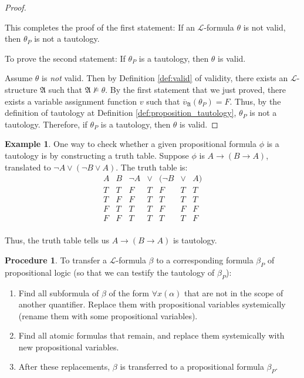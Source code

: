 \documentclass[11pt,letterpaper]{book}
\theoremstyle{definition}
\newtheorem{procedure}{Procedure}[section]
\newtheorem{example}{Example}[section]
\begin{document}
\begin{proof}
\begin{enumerate}
{}
\end{enumerate}
This completes the proof of the first statement: If an
$\mathcal{L}$-formula $\theta$ is not valid, then $\theta_P$ is not a
tautology.


To prove the second statement: If $\theta_P$ is a tautology, then
$\theta$ is valid.

Assume $\theta$ is \emph{not} valid. Then by
Definition \ref{def:valid} of validity, there exists an
$\mathcal{L}$-structure $\mathfrak{A}$ such that $\mathfrak{A} \not
\models \theta$. By the first statement that we just proved, there
exists a variable assignment function $v$ such that
$\overline{v}_{\mathfrak{A}} (\theta_P)  = F$. Thus, by the definition
of tautology at Definition \ref{def:proposition_tautology}, $\theta_P$
is not a tautology. Therefore, if $\theta_P$ is a tautology, then
$\theta$ is valid.
\end{proof}


\begin{example}
One way to check whether a given propositional formula $\phi$ is a
tautology is by constructing a truth table. Suppose $\phi$ is $ A
\rightarrow (B \rightarrow A) $, translated to $\lnot A \lor ( \lnot B
\lor A )$. The truth table is:
\begin{equation}
\begin{array}{cc|c||c||ccc}
A & B & \lnot A & \lor & ( \lnot B & \lor & A)  \\
\hline
T & T & F & T & F & T & T \\
T & F & F & T & T & T & T \\
F & T & T & T & F & F & F \\
F & F & T & T & T & T & F \\
\end{array} \nonumber
\end{equation}

Thus, the truth table tells us $A \rightarrow (B \rightarrow A)$ is
tautology.

\end{example}

\begin{procedure}\label{proc_transfer_to_proposition_logic}
To transfer a $\mathcal{L}$-formula $\beta$ to a corresponding formula
$\beta_{P}$ of propositional logic (so that we can testify the tautology
of $\beta_{P}$):
\begin{enumerate}
\item{Find all subformula of $\beta$ of the form $\forall x (\alpha)$ that
are not in the scope of another quantifier. Replace them with
propositional variables systemically (rename them with some
propositional variables).}
\item{Find all atomic formulas that remain, and replace them
systemically with new propositional variables.}
\item{After these replacements, $\beta$ is transferred to a
propositional formula $\beta_{P}$.}

\end{enumerate}

\end{procedure}
\end{document}
